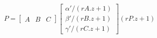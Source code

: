 \documentclass{article}
\begin{document}
\thispagestyle{empty}

$$
P =   \begin{bmatrix}A & B & C\end{bmatrix} \begin{bmatrix}\alpha'/(rA.z+1)\\ \beta'/(rB.z+1)\\ \gamma'/(rC.z+1)\end{bmatrix}(rP.z+1)
$$
\end{document}

